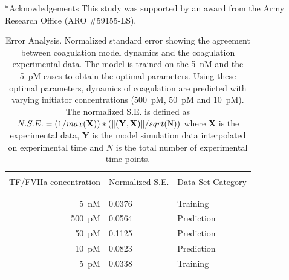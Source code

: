 \documentclass[12pt]{article}
\makeatletter
\renewcommand\section{\@startsection
	{subsection}{2}{0mm}
	{-0.2in}
	{0.05\baselineskip}
	{\normalfont\large\bfseries}}
\makeatother
\begin{document}
\clearpage


\section*{Acknowledgements}
This study was supported by an award from the Army Research Office (ARO \#59155-LS).
\clearpage




\clearpage


\begin{table}[h]
\centering
\caption[.]{Error Analysis. Normalized standard error showing the agreement between coagulation model dynamics and the coagulation experimental data. The model is trained on the 5~nM and the 5~pM cases to obtain the optimal parameters. Using these optimal parameters, dynamics of coagulation are predicted with varying initiator concentrations (500~pM, 50~pM and 10~pM). The normalized S.E. is defined as \( N.S.E.=(1/max(\mathbf{X}))*(\lVert (\mathbf{Y},\mathbf{X}) \rVert /sqrt$(N)$) \) where \textbf{X} is the experimental data, \textbf{Y} is the model simulation data interpolated on experimental time and $N$ is the total number of experimental time points.}
\label{table:Error-Analysis}
\begin{center}
\begin{tabular}{ r|ll}
\hline\\
TF/FVIIa concentration& Normalized S.E.& Data Set Category\\\\
\hline\\
5~nM & 0.0376 & Training \\
500~pM & 0.0564 & Prediction\\
50~pM & 0.1125 & Prediction\\
10~pM & 0.0823 & Prediction\\
5~pM & 0.0338 & Training\\\\
\hline
\end{tabular}
\end{center}
\end{table}
\end{document}
